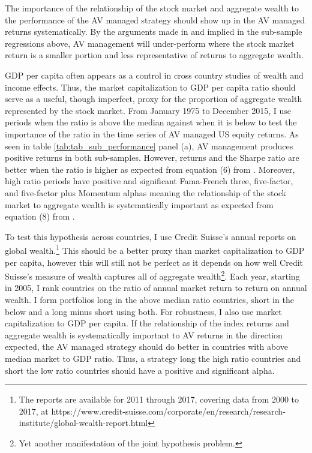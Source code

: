 The importance of the relationship of the stock market and aggregate wealth to the performance of the AV managed strategy should show up in the AV managed returns systematically. By the arguments made in \citet{pollet_average_2010} and implied in the sub-sample regressions above, AV management will under-perform where the stock market return is a smaller portion and less representative of returns to aggregate wealth. 

GDP per capita  often appears as a control in cross country studies of wealth and income effects. \citep{barro_cross-country_1989,levine_what_1993,baird_aggregate_2010} Thus, the market capitalization to GDP per capita ratio should serve as a useful, though imperfect, proxy for the proportion of aggregate wealth represented by the stock market. From January 1975 to December 2015, I use periods when the ratio is above the median against when it is below to test the importance of the ratio in the time series of AV managed US equity returns. As seen in table \ref{tab:tab_sub_performance} panel (a), AV management produces positive returns in both sub-samples. However, returns and the Sharpe ratio are better when the ratio is higher as expected from equation (6) from \citet{pollet_average_2010}. Moreover, high ratio periods have positive and significant Fama-French three, five-factor, and five-factor plus Momentum alphas meaning the relationship of the stock market to aggregate wealth is systematically important as expected from equation (8) from \citet{pollet_average_2010}. %

To test this hypothesis across countries, I use Credit Suisse's annual reports on global wealth.\footnote{The reports are available for 2011 through 2017, covering data from 2000 to 2017, at https://www.credit-suisse.com/corporate/en/research/research-institute/global-wealth-report.html} This should be a better proxy than market capitalization to GDP per capita, however this will still not be perfect as it depends on how well Credit Suisse's measure of wealth captures all of aggregate wealth\footnote{Yet another manifestation of the joint hypothesis problem.}. Each year, starting in 2005, I rank countries on the ratio of annual market return to return on annual wealth. I form portfolios long in the above median ratio countries, short in the below and a long minus short using both. For robustness, I also use market capitalization to GDP per capita. If the relationship of the index returns and aggregate wealth is systematically important to AV returns in the direction expected, the AV managed strategy should do better in countries with above median market to GDP ratio. Thus, a strategy long the high ratio countries and short the low ratio countries should have a positive and significant alpha. 

